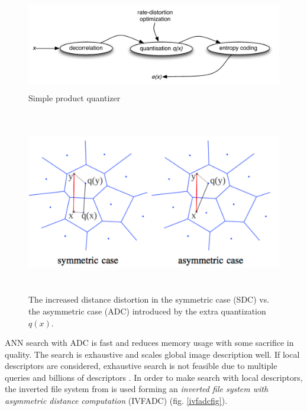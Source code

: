 \documentclass[english,12pt,a4paper,pdftex,elec,utf8, table]{aaltothesis}
\begin{document}
\begin{figure}[htb]
\begin{center}
\includegraphics[height=4cm]{figures/pq}
\end{center}
\caption{Simple product quantizer \cite{Jegou2014}}
\label{pqfig}
\end{figure}

\begin{figure}[htb]
\begin{center}
\includegraphics[height=8cm]{figures/sdcadc}
\end{center}
\caption{The increased distance distortion in the symmetric case (SDC) vs. the asymmetric case (ADC) introduced by the extra quantization $q(x)$. \cite{Jegou2008}}
\label{nosdc}
\end{figure}

ANN search with ADC is fast and reduces memory usage with some sacrifice in quality. The search is exhaustive and scales global image description well. If local descriptors are considered, exhaustive search is not feasible due to multiple queries and billions of descriptors \cite{Jegou2008}. In order to make search with local descriptors, the inverted file system from \cite{Sivic2003} is used forming an \emph{inverted file system with asymmetric distance computation} (IVFADC) (fig. \ref{ivfadcfig}).
\end{document}
